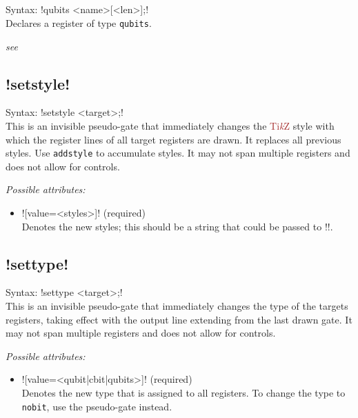 \documentclass{scrartcl}
\def\TikZ{\textcolor{brown}{Ti\textit kZ}}
\def\ttlink{\link\texttt}
\def\yquantlink{\link\yquant}
\begin{document}
      \subsection{\texorpdfstring{}{qubits}}
         Syntax: \yquant!qubits <name>[<len>];! \\
         Declares a register of type \texttt{qubits}.

         \emph{see \yquantlink{qubit}}

      \subsection[\texorpdfstring{\yquant{setstyle}}{setstyle}]{\yquant!setstyle!}
         Syntax: \yquant!setstyle <target>;! \\
         This is an invisible pseudo\hyp gate that immediately changes the \TikZ{} style with which the register lines of all target registers are drawn.
         It replaces all previous styles.
         Use \ttlink{addstyle} to accumulate styles.
         It may not span multiple registers and does not allow for controls.

         \emph{Possible attributes:}
         \begin{itemize}
            \item \yquant![value=<styles>]! (required) \\
               Denotes the new styles; this should be a string that could be passed to \tex!\tikzset!.
         \end{itemize}

      \subsection[\texorpdfstring{\yquant{settype}}{settype}]{\yquant!settype!}
         Syntax: \yquant!settype <target>;! \\
         This is an invisible pseudo\hyp gate that immediately changes the type of the targets registers, taking effect with the output line extending from the last drawn gate.
         It may not span multiple registers and does not allow for controls.

         \emph{Possible attributes:}
         \begin{itemize}
            \item \yquant![value=<qubit|cbit|qubits>]! (required) \\
               Denotes the new type that is assigned to all registers.
               To change the type to \ttlink{nobit}, use the \yquantlink{discard} pseudo\hyp gate instead.
         \end{itemize}
\end{document}
